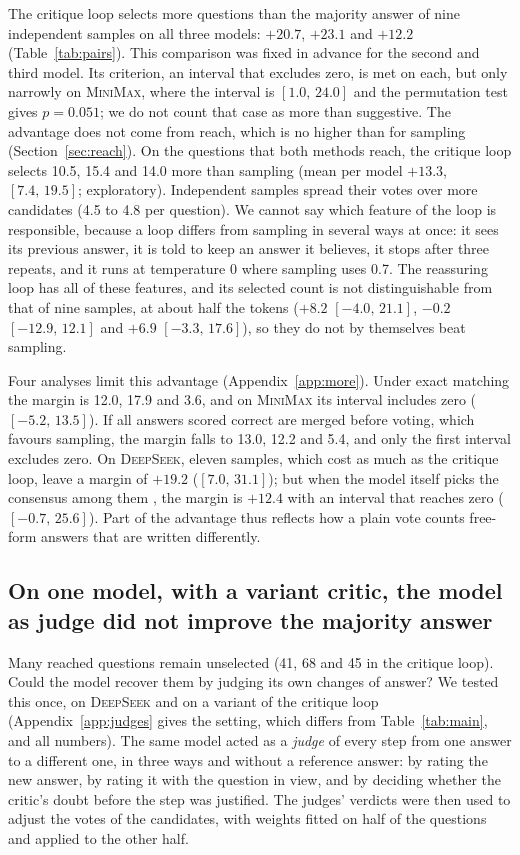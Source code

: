 \documentclass[11pt]{article}
\newcommand{\ds}{\textsc{DeepSeek}}
\newcommand{\mm}{\textsc{MiniMax}}
\newcommand{\ci}[2]{$[#1,\,#2]$}
\begin{document}
The critique loop selects more questions than the majority answer of nine independent samples on all three models: $+20.7$, $+23.1$ and $+12.2$ (Table~\ref{tab:pairs}).
This comparison was fixed in advance for the second and third model.
Its criterion, an interval that excludes zero, is met on each, but only narrowly on \mm{}, where the interval is \ci{1.0}{24.0} and the permutation test gives $p=0.051$; we do not count that case as more than suggestive.
The advantage does not come from reach, which is no higher than for sampling (Section~\ref{sec:reach}).
On the questions that both methods reach, the critique loop selects 10.5, 15.4 and 14.0 more than sampling (mean per model $+13.3$, \ci{7.4}{19.5}; exploratory).
Independent samples spread their votes over more candidates (4.5 to 4.8 per question).
We cannot say which feature of the loop is responsible, because a loop differs from sampling in several ways at once: it sees its previous answer, it is told to keep an answer it believes, it stops after three repeats, and it runs at temperature 0 where sampling uses 0.7.
The reassuring loop has all of these features, and its selected count is not distinguishable from that of nine samples, at about half the tokens ($+8.2$ \ci{-4.0}{21.1}, $-0.2$ \ci{-12.9}{12.1} and $+6.9$ \ci{-3.3}{17.6}), so they do not by themselves beat sampling.

Four analyses limit this advantage (Appendix~\ref{app:more}).
Under exact matching the margin is 12.0, 17.9 and 3.6, and on \mm{} its interval includes zero (\ci{-5.2}{13.5}).
If all answers scored correct are merged before voting, which favours sampling, the margin falls to 13.0, 12.2 and 5.4, and only the first interval excludes zero.
On \ds, eleven samples, which cost as much as the critique loop, leave a margin of $+19.2$ (\ci{7.0}{31.1}); but when the model itself picks the consensus among them \citep{chen2023usc}, the margin is $+12.4$ with an interval that reaches zero (\ci{-0.7}{25.6}).
Part of the advantage thus reflects how a plain vote counts free-form answers that are written differently.

\subsection{On one model, with a variant critic, the model as judge did not improve the majority answer}
\label{sec:judges}

Many reached questions remain unselected (41, 68 and 45 in the critique loop).
Could the model recover them by judging its own changes of answer?
We tested this once, on \ds{} and on a variant of the critique loop (Appendix~\ref{app:judges} gives the setting, which differs from Table~\ref{tab:main}, and all numbers).
The same model acted as a \emph{judge} of every step from one answer to a different one, in three ways and without a reference answer: by rating the new answer, by rating it with the question in view, and by deciding whether the critic's doubt before the step was justified.
The judges' verdicts were then used to adjust the votes of the candidates, with weights fitted on half of the questions and applied to the other half.
\end{document}

